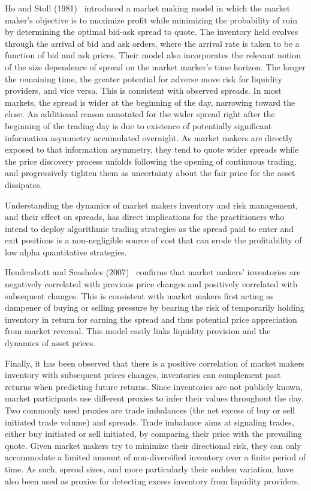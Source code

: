 Ho and Stoll (1981)~\cite{ho1981} introduced a market making model in which the market maker's objective is to maximize profit while minimizing the probability of ruin by determining the optimal bid-ask spread to quote. The inventory held evolves through the arrival of bid and ask orders, where the arrival rate is taken to be a function of bid and ask prices. Their model also incorporates the relevant notion of the size dependence of spread on the market marker's time horizon. The longer the remaining time, the greater potential for adverse move risk for liquidity providers, and vice versa. This is consistent with observed spreads. In most markets, the spread is wider at the beginning of the day, narrowing toward the close. An additional reason annotated for the wider spread right after the beginning of the trading day is due to existence of potentially significant information asymmetry accumulated overnight. As market makers are directly exposed to that information asymmetry, they tend to quote wider spreads while the price discovery process unfolds following the opening of continuous trading, and progressively tighten them as uncertainty about the fair price for the asset dissipates.


Understanding the dynamics of market makers inventory and risk management, and their effect on spreads, has direct implications for the practitioners who intend to deploy algorithmic trading strategies as the spread paid to enter and exit positions is a non-negligible source of cost that can erode the profitability of low alpha quantitative strategies. 


Hendershott and Seasholes (2007)~\cite{hendersea} confirms that market makers' inventories are negatively correlated with previous price changes and positively correlated with subsequent changes. This is consistent with market makers first acting as dampener of buying or selling pressure by bearing the risk of temporarily holding inventory in return for earning the spread and thus potential price appreciation from market reversal. This model easily links liquidity provision and the dynamics of asset prices. 


Finally, it has been observed that there is a positive correlation of market makers inventory with subsequent prices changes, inventories can complement past returns when predicting future returns. Since inventories are not publicly known, market participants use different proxies to infer their values throughout the day. Two commonly used proxies are trade imbalances (the net excess of buy or sell initiated trade volume) and spreads. Trade imbalance aims at signaling trades, either buy initiated or sell initiated, by comparing their price with the prevailing quote. Given market makers try to minimize their directional risk, they can only accommodate a limited amount of non-diversified inventory over a finite period of time. As such, spread sizes, and more particularly their sudden variation, have also been used as proxies for detecting excess inventory from liquidity providers.\label{in:micro2}\label{in:fund_trade4}


